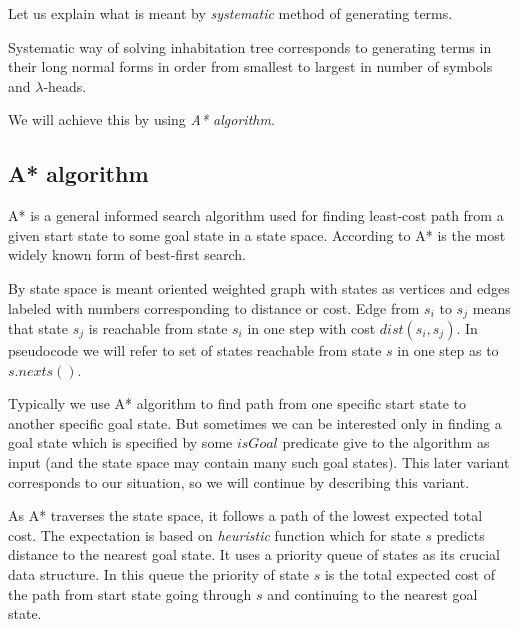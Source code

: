 \documentclass[12pt,a4paper]{report}
\newcommand{\Lets}{Let us\xspace}
\newcommand{\lheads}{$\lambda$-heads\xspace}
\begin{document}
\Lets explain what is meant by \textit{systematic} 
method of generating terms. 

Systematic way of solving inhabitation tree corresponds to
generating terms in their long normal forms
in order from smallest to largest in number of symbols and \lheads.

We will achieve this by using \textit{A* algorithm}. 



\subsection{A* algorithm}

A* is a general informed search algorithm used for finding least-cost 
path from a given start state to some goal state in a state space.
According to \cite{AIAMA} A* is the most widely known form of best-first search.

By state space is meant oriented weighted graph with states as vertices and edges 
labeled with numbers corresponding to distance or cost. 
Edge from $s_i$ to $s_j$ means that state 
$s_j$ is reachable from state $s_i$ in one step with cost $dist(s_i,s_j)$.
In pseudocode we will refer to set of states reachable from 
state $s$ in one step as to $s.nexts()$.

Typically we use A* algorithm to find path from one specific start state to another 
specific goal state. But sometimes  
we can be interested only in finding a goal state which 
is specified by some $isGoal$ predicate give to the algorithm as
input (and the state space may contain many such goal states). 
This later variant corresponds to our situation, 
so we will continue by describing this variant.

As A* traverses the state space, it follows a path of the lowest 
expected total cost. The expectation is based on \textit{heuristic}
function which for state $s$ predicts distance to the nearest goal state. 
It uses a priority queue of states as its crucial data structure.
In this queue the priority of state $s$ is 
the total expected cost of the path from start state 
going through $s$ and continuing to the nearest goal state. \\
\end{document}
